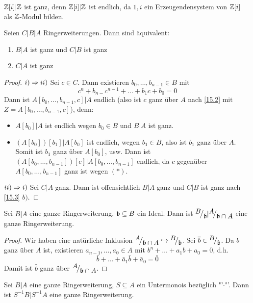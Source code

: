 \begin{bsp}
	$\mathbb{Z}[i]|\mathbb{Z}$ ist ganz, denn $\mathbb{Z}[i]|\mathbb{Z}$ ist endlich, da $1,i$ ein Erzeugendensystem von $\mathbb{Z}[i]$ als $\mathbb{Z}$-Modul bilden.
\end{bsp}
\begin{sa}\label{15.5}
	Seien $C|B|A$ Ringerweiterungen. Dann sind äquivalent:
	\begin{enumerate}[label= \roman*)]
		\item $B|A$ ist ganz und $C|B$ ist ganz
		\item $C|A$ ist ganz
	\end{enumerate}
\end{sa}
\begin{proof}
	$i)\Rightarrow ii)$ Sei $c\in C$. Dann existieren $b_0, \ldots, b_{n-1}\in B $ mit \begin{equation}\tag{$\ast$}
	c^n + b_{n-}c^{n-1} + \ldots + b_1 c+ b_0 =0
	\end{equation}
	Dann ist $A[b_0, \ldots, b_{n-1}, c]|A$ endlich (also ist $c$ ganz über $A$ nach \ref{15.2} mit $Z = A[b_0, \ldots, b_{n-1}, c]$), denn:
	\begin{itemize}
		\item $A[b_0]|A$ ist endlich wegen $b_0\in B$ und $B|A$ ist ganz.
		\item $(A[b_0])[b_1]|A[b_0]$ ist endlich, wegen $b_1\in B$, also ist $b_1$ ganz über $A$. Somit ist $b_1$ ganz über $A[b_0]$, usw. Dann ist $(A[b_0, \ldots, b_{n-1}])[c]|A[b_0, \ldots, b_{n-1}]$ endlich, da $c$ gegenüber $A[b_0, \ldots, b_{n-1}]$ ganz ist wegen $(\ast)$.
	\end{itemize}
	$ii)\Rightarrow i)$ Sei $C|A$ ganz. Dann ist offensichtlich $B|A$ ganz und $C|B$ ist ganz nach \ref{15.3} $b)$.
\end{proof}
\begin{bem}\label{15.6}
	Sei $B|A$ eine ganze Ringerweiterung, $\mathfrak{b}\subseteq B$ ein Ideal. Dann ist $\QR{B}{\b} |\QR{A}{\b \cap A}$ eine ganze Ringerweiterung. 
\end{bem}
\begin{proof}
	Wir haben eine natürliche Inklusion $\QR{A}{\b \cap A} \hookrightarrow \QR{B}{\b}$. Sei $\bar b\in \QR{B}{\b}$. Da $b$ ganz über $A$ ist, existieren $a_{n-1}, \ldots, a_0\in A$ mit $b^n + \ldots + a_1 b + a_0 =0$, d.h. 
	$$\bar b + \ldots + \bar a_1 \bar b + \bar a_0 =\bar 0$$
	Damit ist $\bar b$ ganz über $\QR{A}{\b \cap A}$.
\end{proof}
\begin{bem}\label{15.7}
	Sei $B|A$ eine ganze Ringerweiterung, $S\subseteq A$ ein Untermonois bezüglich "'$\cdot$"'. Dann ist $S^{-1} B |S^{-1} A$ eine ganze Ringerweiterung.
\end{bem}
